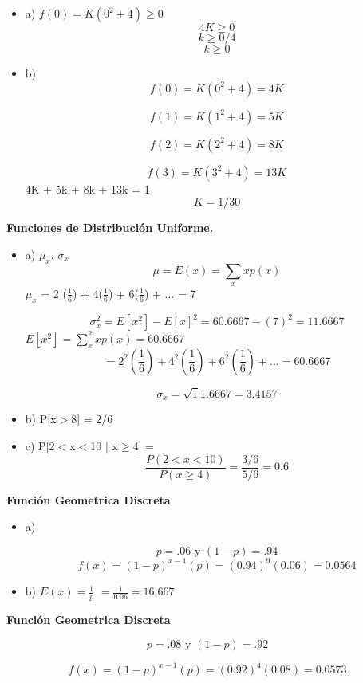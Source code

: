 \documentclass{oxmathproblems}
\begin{document}
\begin{questions}

\begin{itemize}
\item a) $f(0) = K(0^2 + 4) \geq 0 $
$$ 4K \geq 0 $$
 $$ k \geq 0/ 4$$
$$ k \geq 0 $$

\item  b) 
$$f(0) = K(0^2 + 4) =  4K $$

$$f(1) = K(1^2 + 4) =  5K $$

$$f(2) = K(2^2 + 4) =  8K $$

$$f(3) = K(3^2 + 4) =  13K $$
4K + 5k + 8k + 13k = 1
$$ K = 1/30 $$
\end{itemize}

\miquestion\textbf{Funciones de Distribución Uniforme. }
\begin{itemize}
\item  a) $\mu_x$, $\sigma_x$
$$ \mu = E(x)= \sum_x xp(x)$$ 
 $\mu_x$ = 2 ($\frac{1}{6} $) + 4($\frac{1}{6} $) + 6($\frac{1}{6} $) + ... = 7 

$$ \sigma_x^2 = E[x^2]-E[x]^2 = 60.6667 - (7)^2 = 11.6667 $$ 
 $ E[x^2] = \sum_x^2 xp(x)  = 60.6667 $ 
 $$ = 2^2 (\frac{1}{6}) + 4^2(\frac{1}{6}) + 6^2(\frac{1}{6}) + ... =  60.6667 $$ 
 
 $$ \sigma_x  = \sqrt11.6667 = 3.4157 $$ 


\item  b) P[x$>$8] = 2/6

\item  c) P[2$<$x$<$10 $\mid$ x$\geq$4]
= $$  \frac{P(2 < x <10)}{P (x \geq 4)} = \frac{3/6}{5/6} = 0.6 $$ 
\end{itemize}

\miquestion\textbf { Función Geometrica Discreta}
\begin{itemize}
\item a)


$$ p = .06 \text{ y }
(1 - p )= .94 $$ 
$$ f(x) = (1-p)^{x-1} (p)  = (0.94)^9(0.06) = 0.0564 $$
\item b) 
$ E(x) = \frac{1}{p} $ 
$ = \frac{1}{0.06} = 16.667 $
\end{itemize}

\miquestion\textbf { Función Geometrica Discreta}

$$ p = .08 \text{ y }
(1 - p )= .92 $$ 

$$ f(x) = (1-p)^{x-1} (p)  = (0.92)^4(0.08) = 0.0573 $$

\end {questions}
\end{document}
